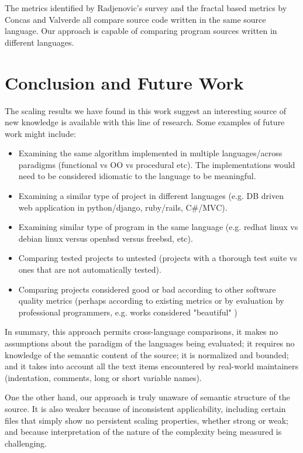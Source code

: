 \documentclass[12pt]{article}
\begin{document}
The metrics identified by Radjenovic's survey and the fractal based metrics by Concas and Valverde all compare source code written in the same source language.  Our approach is capable of comparing program sources written in different languages.



\section{Conclusion and Future Work}

The scaling results we have found in this work suggest an interesting source of new knowledge is available with this line of research.  Some examples of future work might include:
\begin{itemize}
\item Examining the same algorithm implemented in multiple languages/across paradigms (functional vs OO vs procedural etc).  The implementations would need to be considered idiomatic to the language to be meaningful.
\item Examining a similar type of project in different languages (e.g. DB driven web application in python/django, ruby/rails, C\#/MVC).
\item Examining similar type of program in the same language (e.g. redhat linux vs debian linux versus openbsd versus freebsd, etc).
\item Comparing tested projects to untested (projects with a thorough test suite vs ones that are not automatically tested).
\item Comparing projects considered good or bad according to other software quality metrics (perhaps according to existing metrics or by evaluation by professional programmers, e.g. works considered "beautiful" \cite{Wilson:BeautifulCode:07})
\end{itemize}

In summary, this approach permits cross-language comparisons, it makes no assumptions about the paradigm of the languages being evaluated; it requires no knowledge of the semantic content of the source; it is normalized and bounded; and it takes into account all the text items encountered by real-world maintainers (indentation, comments, long or short variable names).  

One the other hand, our approach is truly unaware of semantic structure of the source.  It is also weaker because of inconsistent applicability, including certain files that simply show no persistent scaling properties, whether strong or weak; and because interpretation of the nature of the complexity being measured is challenging.
\end{document}
